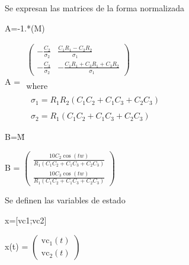 \documentclass[10pt,a4paper]{article} %
\begin{document}
\begin{par}
	\begin{flushleft}
		Se expresan las matrices de la forma normalizada
	\end{flushleft}
\end{par}

\begin{matlabcode}
	A=-1.*(M\N)
\end{matlabcode}
\begin{matlabsymbolicoutput}
	A = 
	$\displaystyle \begin{array}{l}
	\left(\begin{array}{cc}
	-\frac{C_2 }{\sigma_2 } & \frac{C_1  R_1 -C_2  R_2 }{\sigma_1 }\\
	-\frac{C_3 }{\sigma_2 } & -\frac{C_1  R_1 +C_3  R_1 +C_3  R_2 }{\sigma_1 }
	\end{array}\right)\\
	\mathrm{}\\
	\textrm{where}\\
	\mathrm{}\\
	\;\;\sigma_1 =R_1  R_2  {\left(C_1  C_2 +C_1  C_3 +C_2  C_3 \right)}\\
	\mathrm{}\\
	\;\;\sigma_2 =R_1  {\left(C_1  C_2 +C_1  C_3 +C_2  C_3 \right)}
	\end{array}$
\end{matlabsymbolicoutput}
\begin{matlabcode}
	
	B=M\u
\end{matlabcode}
\begin{matlabsymbolicoutput}
	B = 
	$\displaystyle \left(\begin{array}{c}
	\frac{10 C_2  \cos \left(t w\right)}{R_1  {\left(C_1  C_2 +C_1  C_3 +C_2  C_3 \right)}}\\
	\frac{10 C_3  \cos \left(t w\right)}{R_1  {\left(C_1  C_2 +C_1  C_3 +C_2  C_3 \right)}}
	\end{array}\right)$
\end{matlabsymbolicoutput}

\begin{par}
	\begin{flushleft}
		Se definen las variables de estado
	\end{flushleft}
\end{par}

\begin{matlabcode}
	x=[vc1;vc2]
\end{matlabcode}
\begin{matlabsymbolicoutput}
	x(t) = 
	$\displaystyle \left(\begin{array}{c}
	{\textrm{vc}}_1 \left(t\right)\\
	{\textrm{vc}}_2 \left(t\right)
	\end{array}\right)$
\end{matlabsymbolicoutput}
\end{document}
